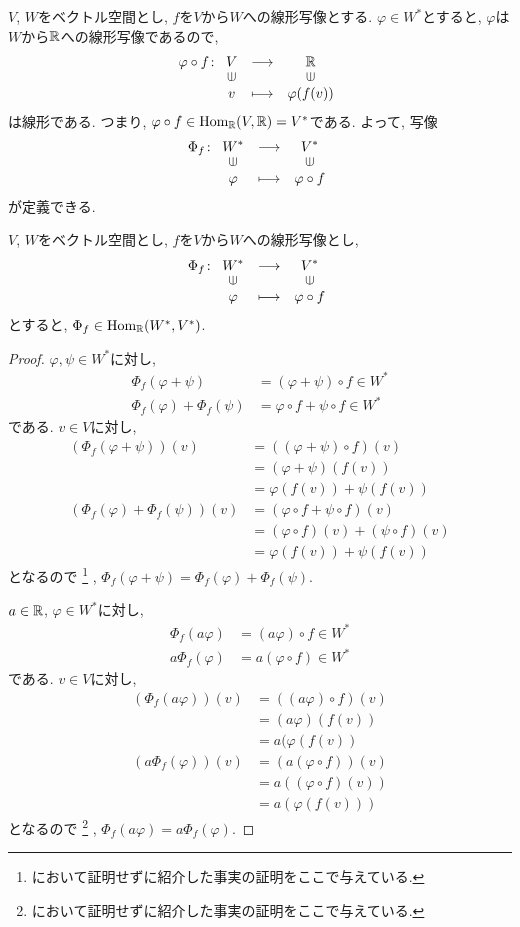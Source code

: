 $V$, $W$をベクトル空間とし,
$f$を$V$から$W$への線形写像とする.
$\varphi\in W^\ast$とすると,
$\varphi$は$W$から$\mathbb{R}$への線形写像であるので,
\begin{align*}
  \varphi\circ f\colon
  \Shazo{V}{\RR}
        {v}{\varphi(f(v))}
\end{align*}
は線形である.
つまり, $\varphi\circ f \in \operatorname{Hom}_{\mathbb{R}}(V,\mathbb{R})=V^\ast$である.
よって,
写像
\begin{align*}
  \Phi_f\colon
  \Shazo{W^\ast}{V^\ast}
        {\varphi}{\varphi\circ f}
\end{align*}
が定義できる.
\begin{lemma}
$V$, $W$をベクトル空間とし,
$f$を$V$から$W$への線形写像とし,
  \begin{align*}
    \Phi_f\colon
    \Shazo{W^\ast}{V^\ast}
          {\varphi}{\varphi\circ f}
\end{align*}
とすると, $\Phi_f\in \operatorname{Hom}_{\mathbb{R}}(W^\ast,V^\ast)$.
\end{lemma}
\begin{proof}
  $\varphi,\psi\in W^\ast$に対し,
  \begin{align*}
    \Phi_f(\varphi+\psi)&=(\varphi+\psi)\circ f \in W^\ast\\
    \Phi_f(\varphi)+\Phi_f(\psi)&=\varphi\circ f+\psi\circ f \in W^\ast
  \end{align*}
  である.
  $v\in V$に対し,
  \begin{align*}
    (\Phi_f(\varphi+\psi))(v)
    &=((\varphi+\psi)\circ f )(v)\\
    &=(\varphi+\psi)(f (v))\\
    &=\varphi(f (v))+\psi(f (v))\\
    (\Phi_f(\varphi)+\Phi_f(\psi))(v)
    &=(\varphi\circ f+\psi\circ f )(v)\\
    &=(\varphi\circ f)(v)+(\psi\circ f )(v)\\
    &=\varphi(f(v))+\psi( f (v))
  \end{align*}
  となるので%
  \footnote{において証明せずに紹介した事実の証明をここで与えている.}%
  ,
  $\Phi_f(\varphi+\psi)=\Phi_f(\varphi)+\Phi_f(\psi)$.

  $a\in \mathbb{R}$,
  $\varphi\in W^\ast$に対し,
  \begin{align*}
    \Phi_f(a\varphi)&=(a\varphi)\circ f \in W^\ast\\
    a\Phi_f(\varphi)&=a(\varphi\circ f)\in W^\ast
  \end{align*}
  である.
  $v\in V$に対し,
  \begin{align*}
    (\Phi_f(a\varphi))(v)
    &=((a\varphi)\circ f)(v)\\ 
    &=(a\varphi)(f(v))\\ 
    &=a(\varphi(f(v))\\ 
    (a\Phi_f(\varphi))(v)
    &=(a(\varphi\circ f))(v)\\
    &=a((\varphi\circ f)(v))\\
    &=a(\varphi(f(v)))
  \end{align*}
  となるので%
  \footnote{において証明せずに紹介した事実の証明をここで与えている.}%
  ,
  $\Phi_f(a\varphi)=a\Phi_f(\varphi)$.
\end{proof}
